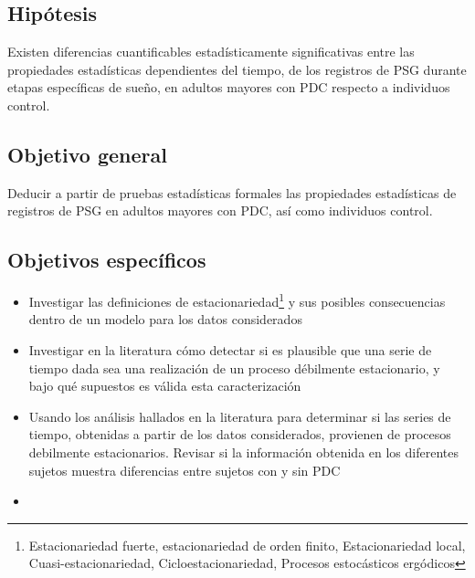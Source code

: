 
\subsection{Hip\'otesis}

Existen diferencias cuantificables estad\'isticamente significativas entre las propiedades
estad\'isticas dependientes del tiempo, de los registros de PSG
durante etapas espec\'ificas de sue\~no, en adultos
mayores con PDC respecto a individuos control.


\subsection{Objetivo general}

Deducir a partir de pruebas estad\'isticas formales las propiedades
estad\'isticas de registros de PSG en adultos mayores con PDC, as\'i como individuos control.


\subsection{Objetivos espec\'ificos}

\begin{itemize}
\item Investigar las definiciones de estacionariedad\footnote{Estacionariedad fuerte, 
estacionariedad de orden finito, Estacionariedad local, Cuasi-estacionariedad,
Cicloestacionariedad, Procesos estoc\'asticos erg\'odicos} y sus posibles consecuencias dentro
de un modelo para los datos considerados

\item Investigar en la literatura c\'omo detectar si es plausible que una serie de tiempo 
dada sea una realizaci\'on de un proceso d\'ebilmente estacionario, 
y bajo qu\'e supuestos es v\'alida esta caracterizaci\'on

\item Usando los an\'alisis hallados en la literatura para determinar si las series de tiempo,
obtenidas a partir de los datos considerados, provienen de procesos
debilmente estacionarios.
Revisar si la informaci\'on obtenida en los diferentes sujetos muestra diferencias entre
sujetos con y sin PDC


\item 
\end{itemize}

